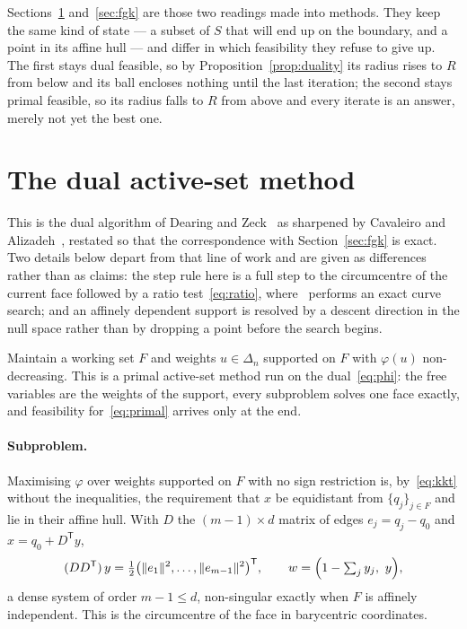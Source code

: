 \documentclass[10pt,a4paper]{article}
\theoremstyle{plain}
\newcommand{\norm}[1]{\lVert #1 \rVert}
\newcommand{\T}{^{\mathsf{T}}}
\begin{document}
Sections~\ref{sec:method} and~\ref{sec:fgk} are those two readings made into
methods. They keep the same kind of state --- a subset of $S$ that will end up on
the boundary, and a point in its affine hull --- and differ in which feasibility
they refuse to give up. The first stays dual feasible, so by
Proposition~\ref{prop:duality} its radius rises to $R$ from below and its ball
encloses nothing until the last iteration; the second stays primal feasible, so
its radius falls to $R$ from above and every iterate is an answer, merely not yet
the best one.

\section{The dual active-set method}
\label{sec:method}

This is the dual algorithm of Dearing and Zeck~\cite{dearing2009} as sharpened by
Cavaleiro and Alizadeh~\cite{cavaleiro2018,cavaleiro2021}, restated so that the
correspondence with Section~\ref{sec:fgk} is exact. Two details below depart from
that line of work and are given as differences rather than as claims: the step
rule here is a full step to the circumcentre of the current face followed by a
ratio test~\eqref{eq:ratio}, where~\cite{cavaleiro2021} performs an exact curve
search; and an affinely dependent support is resolved by a descent direction in
the null space rather than by dropping a point before the search begins.

Maintain a working set $F$ and weights $u\in\Delta_n$ supported on $F$ with
$\varphi(u)$ non-decreasing. This is a primal active-set method run on the
dual~\eqref{eq:phi}: the free variables are the weights of the support, every
subproblem solves one face exactly, and feasibility for~\eqref{eq:primal} arrives
only at the end.

\paragraph{Subproblem.} Maximising $\varphi$ over weights supported on $F$ with no
sign restriction is, by~\eqref{eq:kkt} without the inequalities, the requirement
that $x$ be equidistant from $\{q_j\}_{j\in F}$ and lie in their affine hull.
With $D$ the $(m-1)\times d$ matrix of edges $e_j=q_j-q_0$ and $x=q_0+D\T y$,
\begin{equation}
  \label{eq:sub}
  (DD\T)\,y=\tfrac12\bigl(\norm{e_1}^2,\dots,\norm{e_{m-1}}^2\bigr)\T,
  \qquad w=\Bigl(1-\textstyle\sum_j y_j,\ y\Bigr),
\end{equation}
a dense system of order $m-1\le d$, non-singular exactly when $F$ is affinely
independent. This is the circumcentre of the face in barycentric coordinates.
\end{document}
